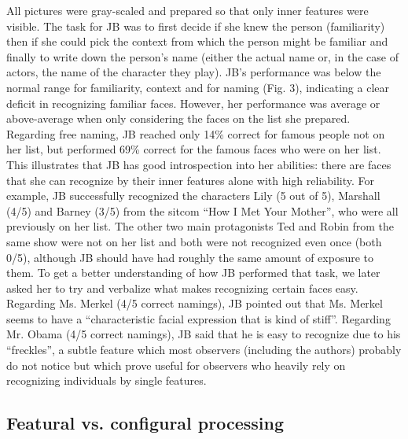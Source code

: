 \documentclass[fleqn,10pt]{SelfArx} %
\begin{document}
All pictures were gray-scaled and prepared so that only inner features were visible. The task for JB was to first decide if she knew the person (familiarity) then if she could pick the context from which the person might be familiar and finally to write down the person's name (either the actual name or, in the case of actors, the name of the character they play).
JB's performance was below the normal range for familiarity, context and for naming (Fig. 3), indicating a clear deficit in recognizing familiar faces. However, her performance was average or above-average when only considering the faces on the list she prepared. Regarding free naming, JB reached only 14\% correct for famous people not on her list, but performed 69\% correct for the famous faces who were on her list. This illustrates that JB has good introspection into her abilities: there are faces that she can recognize by their inner features alone with high reliability. For example, JB successfully recognized the characters Lily (5 out of 5), Marshall (4/5) and Barney (3/5) from the sitcom “How I Met Your Mother”, who were all previously on her list. The other two main protagonists Ted and Robin from the same show were not on her list and both were not recognized even once (both 0/5), although JB should have had roughly the same amount of exposure to them.
To get a better understanding of how JB performed that task, we later asked her to try and verbalize what makes recognizing certain faces easy. Regarding Ms. Merkel (4/5 correct namings), JB pointed out that Ms. Merkel seems to have a “characteristic facial expression that is kind of stiff”. Regarding Mr. Obama (4/5 correct namings), JB said that he is easy to recognize due to his “freckles”, a subtle feature which most observers (including the authors) probably do not notice but which prove useful for observers who heavily rely on recognizing individuals by single features.





\subsection*{Featural vs. configural processing}
\end{document}
